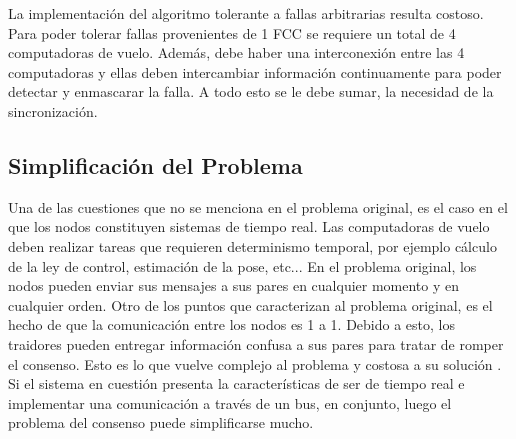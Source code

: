 La implementación del algoritmo tolerante a fallas arbitrarias resulta costoso. Para poder tolerar fallas provenientes de 1 FCC se requiere un total de 4 computadoras de vuelo. Además, debe haber una interconexión entre las 4 computadoras y ellas deben intercambiar información continuamente para poder detectar y enmascarar la falla. A todo esto se le debe sumar, la necesidad de la sincronización.\\









\subsection{Simplificación del Problema}

Una de las cuestiones que no se menciona en el problema original, es el caso en el que los nodos constituyen sistemas de tiempo real. Las computadoras de vuelo deben realizar tareas que requieren determinismo temporal, por ejemplo cálculo de la ley de control, estimación de la pose, etc... En el problema original, los nodos pueden enviar sus mensajes a sus pares en cualquier momento y en cualquier orden. Otro de los puntos que caracterizan al problema original, es el hecho de que la comunicación entre los nodos es 1 a 1. Debido a esto, los traidores pueden entregar información confusa a sus pares para tratar de romper el consenso. Esto es lo que vuelve complejo al problema \cite{lamport2019byzantine} y costosa a su solución \cite{roth2021not}. Si el sistema en cuestión presenta la características de ser de tiempo real e implementar una comunicación a través de un bus, en conjunto, luego el problema del consenso puede simplificarse mucho.\\

